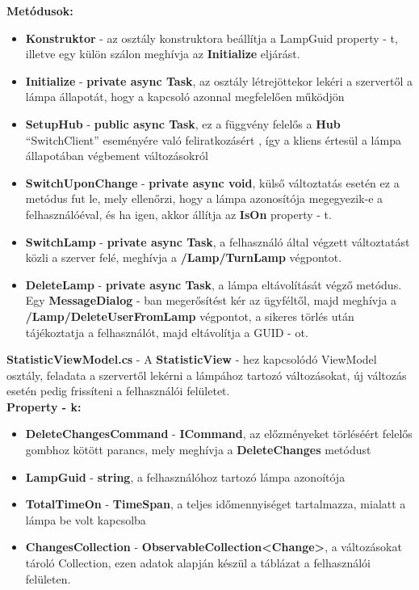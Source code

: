\documentclass[a4paper,12pt]{report}
\begin{document}
    \textbf{Metódusok:}

    \begin{itemize}
        \item \textbf{Konstruktor} - az osztály konstruktora beállítja a LampGuid property - t, illetve egy külön szálon meghívja az \textbf{Initialize} eljárást.
        \item \textbf{Initialize} - \textbf{private async Task}, az osztály létrejöttekor lekéri a szervertől a lámpa állapotát, hogy a kapcsoló
        azonnal megfelelően működjön
        \item \textbf{SetupHub} - \textbf{public async Task}, ez a függvény felelős a \textbf{Hub} ``SwitchClient'' eseményére való feliratkozásért
        , így a kliens értesül a lámpa állapotában végbement változásokról
        \item \textbf{SwitchUponChange} - \textbf{private async void}, külső változtatás esetén ez a metódus fut le, mely ellenőrzi, hogy a lámpa
        azonosítója megegyezik-e a felhasználóéval, és ha igen, akkor állítja az \textbf{IsOn} property - t.
        \item \textbf{SwitchLamp} - \textbf{private async Task}, a felhasználó által végzett változtatást közli a szerver felé, meghívja a
        \textbf{/Lamp/TurnLamp} végpontot.
        \item \textbf{DeleteLamp} - \textbf{private async Task}, a lámpa eltávolítását végző metódus.  Egy \textbf{MessageDialog} - ban megerősítést
        kér az ügyféltől, majd meghívja a \textbf{/Lamp/DeleteUserFromLamp} végpontot, a sikeres törlés után tájékoztatja a felhasználót, majd
        eltávolítja a GUID - ot.
    \end{itemize}

    \textbf{StatisticViewModel.cs} - A \textbf{StatisticView} - hez kapcsolódó ViewModel osztály, feladata a szervertől lekérni a lámpához
    tartozó változásokat, új változás esetén pedig frissíteni a felhasználói felületet.\\

    \textbf{Property - k:}

    \begin{itemize}
        \item \textbf{DeleteChangesCommand} - \textbf{ICommand}, az előzményeket törléséért felelős gombhoz kötött parancs, mely meghívja a
        \textbf{DeleteChanges} metódust
        \item \textbf{LampGuid} - \textbf{string}, a felhasználóhoz tartozó lámpa azonoítója
        \item \textbf{TotalTimeOn} - \textbf{TimeSpan}, a teljes időmennyiséget tartalmazza, mialatt a lámpa be volt kapcsolba
        \item \textbf{ChangesCollection} - \textbf{ObservableCollection<Change>}, a változásokat tároló Collection, ezen adatok
        alapján készül a táblázat a felhasználói felületen.
    \end{itemize}
\end{document}
